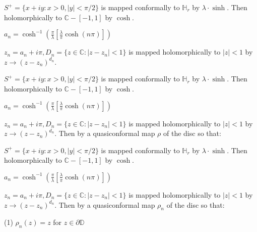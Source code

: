 \documentclass{beamer}
\begin{document}
\begin{frame} 

$S^+ = \{ x + iy : x > 0, |y| < \pi/2 \}$ is mapped conformally to $\mathbb{H}_r$ by $\lambda\cdot\sinh$. Then holomorphically to $\mathbb{C} - [-1,1]$ by $\cosh$.

\vspace{2.5mm}

$a_n = \cosh^{-1}\left( \frac{\pi}{\lambda} \left[ \frac{\lambda}{\pi} \cosh(n\pi) \right] \right)$

\vspace{2.5mm}

$z_n = a_n + i\pi, D_n = \{ z \in \mathbb{C} : \left| z - z_n \right| < 1\} $ is mapped holomorphically to $|z|<1$ by $z\rightarrow (z - z_n)^{d_n}$.

\end{frame}






\begin{frame} 

$S^+ = \{ x + iy : x > 0, |y| < \pi/2 \}$ is mapped conformally to $\mathbb{H}_r$ by $\lambda\cdot\sinh$. Then holomorphically to $\mathbb{C} - [-1,1]$ by $\cosh$.

\vspace{2.5mm}

$a_n = \cosh^{-1}\left( \frac{\pi}{\lambda} \left[ \frac{\lambda}{\pi} \cosh(n\pi) \right] \right)$

\vspace{2.5mm}

$z_n = a_n + i\pi, D_n = \{ z \in \mathbb{C} : \left| z - z_n \right| < 1\} $ is mapped holomorphically to $|z|<1$ by $z\rightarrow (z - z_n)^{d_n}$. Then by a quasiconformal map $\rho$ of the disc so that: 

\end{frame}





\begin{frame} 

$S^+ = \{ x + iy : x > 0, |y| < \pi/2 \}$ is mapped conformally to $\mathbb{H}_r$ by $\lambda\cdot\sinh$. Then holomorphically to $\mathbb{C} - [-1,1]$ by $\cosh$.

\vspace{2.5mm}

$a_n = \cosh^{-1}\left( \frac{\pi}{\lambda} \left[ \frac{\lambda}{\pi} \cosh(n\pi) \right] \right)$

\vspace{2.5mm}

$z_n = a_n + i\pi, D_n = \{ z \in \mathbb{C} : \left| z - z_n \right| < 1\} $ is mapped holomorphically to $|z|<1$ by $z\rightarrow (z - z_n)^{d_n}$. Then by a quasiconformal map $\rho_n$ of the disc so that: 

\hspace{5mm} (1) $\rho_n(z)=z$ for $z\in\partial\mathbb{D}$

\end{frame}
\end{document}
